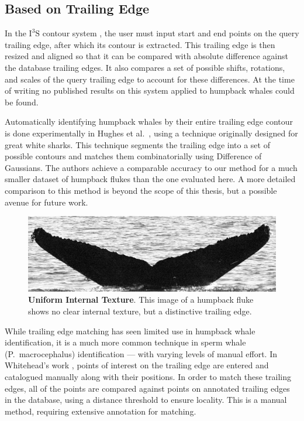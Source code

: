 \subsection{Based on Trailing Edge}

In the $\text{I}^3\text{S}$ contour system \cite{i3scontour}, the user must input start and end points on the query trailing edge, after which its contour is extracted.
This trailing edge is then resized and aligned so that it can be compared with absolute difference against the database trailing edges.
It also compares a set of possible shifts, rotations, and scales of the query trailing edge to account for these differences.
At the time of writing no published results on this system applied to humpback whales could be found.

Automatically identifying humpback whales by their entire trailing edge contour is done experimentally in Hughes et al.\ \cite{hughes2015automated}, using a technique originally designed for great white sharks. 
This technique segments the trailing edge into a set of possible contours and matches them combinatorially using Difference of Gaussians.
The authors achieve a comparable accuracy to our method for a much smaller dataset of humpback flukes than the one evaluated here.
A more detailed comparison to this method is beyond the scope of this thesis, but a possible avenue for future work.

\begin{figure}[t]%
\centering
\includegraphics[width=1.0\textwidth]{../images/unclear_texture.jpg}
\caption{\textbf{Uniform Internal Texture}. This image of a humpback fluke shows no clear internal texture, but a distinctive trailing edge.}
\label{fig:unclear_texture}
\end{figure}

While trailing edge matching has seen limited use in humpback whale identification, it is a much more common technique in sperm whale (P.\ macrocephalus) identification \cite{huele2000finding, beekmans2005comparison, whitehead1990computer} --- with varying levels of manual effort.
In Whitehead's work \cite{whitehead1990computer}, points of interest on the trailing edge are entered and catalogued manually along with their positions.
In order to match these trailing edges, all of the points are compared against points on annotated trailing edges in the database, using a distance threshold to ensure locality.
This is a manual method, requiring extensive annotation for matching.

